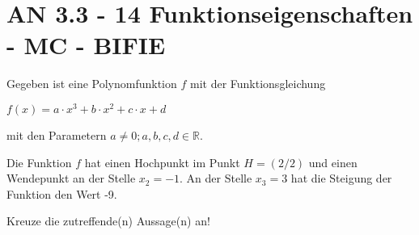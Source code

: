 \section{AN 3.3 - 14 Funktionseigenschaften - MC - BIFIE}

\begin{beispiel}[AN 3.3]{1} %
				Gegeben ist eine Polynomfunktion $f$ mit der Funktionsgleichung \begin{center}$f(x)=a\cdot x^3+b\cdot x^2+c\cdot x+d$\end{center} mit den Parametern $a\neq 0;a,b,c,d\in\mathbb{R}$.
				
				Die Funktion $f$ hat einen Hochpunkt im Punkt $H=(2/2)$ und einen Wendepunkt an der Stelle $x_2=-1$. An der Stelle $x_3=3$ hat die Steigung der Funktion den Wert -9.
				
				Kreuze die zutreffende(n) Aussage(n) an!
\end{beispiel}